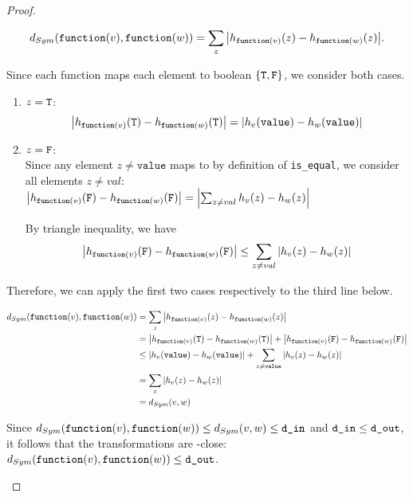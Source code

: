 \begin{proof}
\begin{enumerate}
$$d_{Sym}(\texttt{function}(v), \texttt{function}(w)) = \sum_z \abs{h_{\texttt{function}(v)}(z) - h_{\texttt{function}(w)}(z)}.$$

Since each function maps each element to boolean $\{ \texttt{T}, \texttt{F}\}$, we consider both cases. 
\begin{enumerate}
    \item $z = \texttt{T}$:\\
    $$\abs{h_{\texttt{function}(v)}(\texttt{T}) - h_{\texttt{function}(w)}(\texttt{T})} = \abs{h_v(\texttt{value}) - h_w(\texttt{value})}$$
    
    \item $z = \texttt{F}$:\\
    
    Since any element $z \neq \texttt{value}$ maps to \F by definition of \texttt{is\_equal}, we consider all elements $z \neq val$:
    $\abs{h_{\texttt{function}(v)}(\texttt{F}) - h_{\texttt{function}(w)}(\texttt{F})} = \abs{\sum_{z \neq val} h_v(z) - h_w(z)}$
    
    By triangle inequality, we have 
    $$\abs{h_{\texttt{function}(v)}(\texttt{F}) - h_{\texttt{function}(w)}(\texttt{F})} \leq \sum_{z \neq val} \abs{h_v(z) - h_w(z)}$$
\end{enumerate}


Therefore, we can apply the first two cases respectively to the third line below. 

\begin{align*}
    d_{Sym}(\texttt{function}(v), \texttt{function}(w)) &= \sum_z \abs{h_{\texttt{function}(v)}(z) - h_{\texttt{function}(w)}(z)} \\
    &= \abs{h_{\texttt{function}(v)}(\texttt{T}) - h_{\texttt{function}(w)}(\texttt{T})} + \abs{h_{\texttt{function}(v)}(\texttt{F}) - h_{\texttt{function}(w)}(\texttt{F})} \\ 
    &\leq \abs{h_{v}(\texttt{value}) - h_{w}(\texttt{value})} + \sum_{z \neq \texttt{value}} \abs{h_{v}(z) - h_{w}(z)}\\
    &= \sum_z \abs{h_{v}(z) - h_{w}(z)} \\
    &= d_{Sym}(v, w)
\end{align*}

Since $d_{Sym}(\texttt{function}(v), \texttt{function}(w)) \leq d_{Sym}(v, w) \leq \texttt{d\_in}$ and $\texttt{d\_in} \leq \texttt{d\_out}$, it follows that the transformations are \dout-close: $d_{Sym}(\texttt{function}(v), \texttt{function}(w)) \leq \texttt{d\_out}$.


\end{enumerate}
\end{proof}


